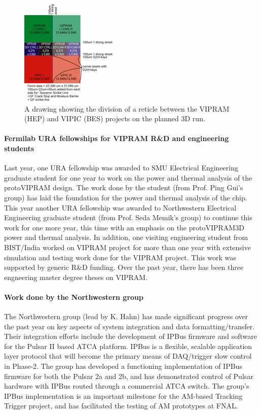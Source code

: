 \begin{figure}[ht!]
\centering
\includegraphics[width=0.35\columnwidth]{Plots/VIPRAM-MPW.png}
\caption{A drawing showing the division of a reticle between the VIPRAM (HEP) and VIPIC (BES) projects on the planned 3D run.
}
\label{fig:VIPRAM-MPW}
\end{figure}




\paragraph{Fermilab URA fellowships for VIPRAM R\&D and engineering students}

Last year, one URA fellowship was awarded to SMU Electrical Engineering graduate student for one year to work on the power and thermal analysis of the protoVIPRAM design. The work done by the student (from Prof. Ping Gui's group) 
has laid the foundation for the power and thermal analysis of the chip. This year another URA fellowship was awarded to Northwestern Electrical Engineering graduate student (from Prof. Seda Memik's group) to continue this work for one more year, this time with an emphasis on the protoVIPRAM3D power and thermal analysis. In addition, one visiting engineering student from BIST/India worked on
VIPRAM project for more than one year with extensive simulation and testing work done for the VIPRAM project.
This work was supported by generic R\&D funding. Over the past year, there has been three engneering master degree theses on VIPRAM. 

\paragraph{Work done by the Northwestern group}

The Northwestern group (lead by K. Hahn) has made significant progress over the past year on key aspects of system integration and data formatting/transfer.  Their integration efforts include the development of IPBus firmware and software for the Pulsar II based ATCA platform.  IPBus is a flexible, scalable application layer protocol that will become the primary means of DAQ/trigger slow control in Phase-2.  The group has developed a functioning implementation of IPBus firmware for both the Pulsar 2a and 2b, and has demonstrated control of Pulsar hardware with IPBus routed through a commercial ATCA switch.  The group's IPBus implementation is an important milestone for the AM-based Tracking Trigger project, and has facilitated the testing of AM prototypes at FNAL.


